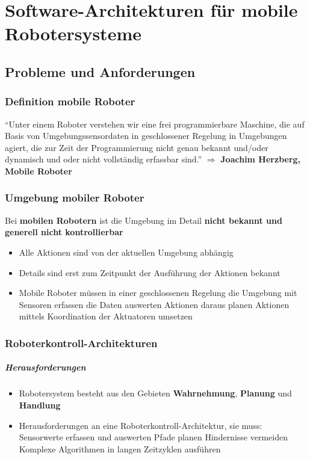 
\chapter{Software-Architekturen für mobile Robotersysteme}
\section{Probleme und Anforderungen}
\subsection{Definition mobile Roboter}
\enquote{Unter einem Roboter verstehen wir eine frei programmierbare Maschine, die auf Basis von Umgebungssensordaten in geschlossener Regelung in Umgebungen agiert, die zur Zeit der Programmierung nicht genau bekannt und/oder dynamisch und oder nicht vollständig erfassbar sind.}
$\Rightarrow$ \textbf{Joachim Herzberg, Mobile Roboter}
\subsection{Umgebung mobiler Roboter}
Bei \textbf{mobilen Robotern} ist die Umgebung im Detail \textbf{nicht bekannt und generell nicht kontrollierbar}
\begin{itemize}
	\item Alle Aktionen sind von der aktuellen Umgebung abhängig
	\item Details sind erst zum Zeitpunkt der Ausführung der Aktionen bekannt
	\item Mobile Roboter müssen in einer geschlossenen Regelung
		\subitem die Umgebung mit Sensoren erfassen
		\subitem die Daten auswerten
		\subitem Aktionen daraus planen
		\subitem Aktionen mittels Koordination der Aktuatoren umsetzen
\end{itemize}
\subsection{Roboterkontroll-Architekturen}
\paragraph{Herausforderungen}
\begin{itemize}
	\item Robotersystem besteht aus den Gebieten \textbf{Wahrnehmung}, \textbf{Planung} und \textbf{Handlung}
	\item Herausforderungen an eine Roboterkontroll-Architektur, sie muss:
	\subitem Sensorwerte erfassen und auswerten
	\subitem Pfade planen
	\subitem Hindernisse vermeiden
	\subitem Komplexe Algorithmen in langen Zeitzyklen ausführen
\end{itemize}
